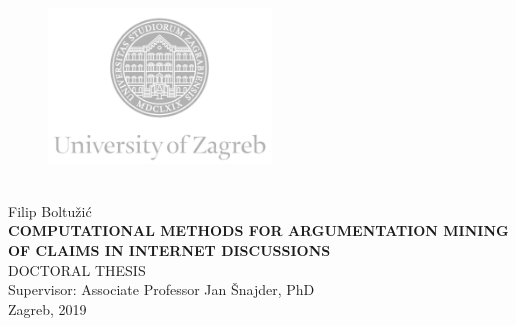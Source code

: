 \documentclass[12pt,oneside, a4paper]{book}
\begin{document}
\begin{titlepage}
  \fontsize{16pt}{20pt}\selectfont
  \selectfont
  \setlength{\intextsep}{0pt plus 0pt minus 0pt}

  \begin{center}
    \begin{figure}[ht!]
      \begin{center}
        \includegraphics[height=4.1184cm, width=5.94cm]{logo_unizg_eng}
      \end{center}
    \end{figure}		
    \vspace{0cm}
    {} \\
    \vspace{3cm}
    Filip Boltužić \\
    \vspace{2cm}
    {\fontsize{22pt}{22pt}\selectfont\textbf{
COMPUTATIONAL METHODS FOR ARGUMENTATION MINING OF CLAIMS IN INTERNET DISCUSSIONS}} \\
    \vspace{2cm}   
    DOCTORAL THESIS \\  
    \vspace{5cm}   %
    Supervisor: Associate Professor Jan Šnajder, PhD \\
    \vfill{Zagreb, 2019}
  \end{center}
  \restoregeometry
\end{titlepage}
\end{document}
